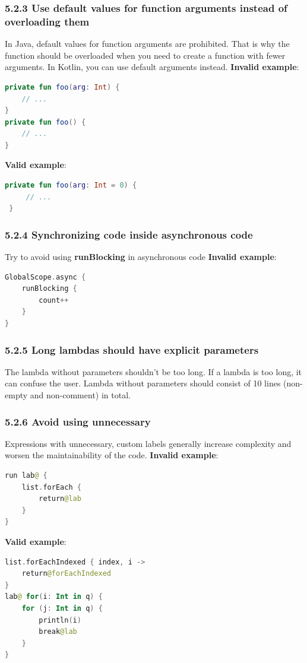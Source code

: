 \subsubsection*{\textbf{5.2.3 Use default values for function arguments instead of overloading them}}
\leavevmode\newline
\label{sec:5.2.3}
In Java, default values for function arguments are prohibited. That is why the function should be overloaded when you need to create a function with fewer arguments.
In Kotlin, you can use default arguments instead.
\textbf{Invalid example}:
\begin{lstlisting}[language=Kotlin]
private fun foo(arg: Int) {
    // ...
}
private fun foo() {
    // ...
}
\end{lstlisting}
\textbf{Valid example}:
\begin{lstlisting}[language=Kotlin]
 private fun foo(arg: Int = 0) {
     // ...
 }
\end{lstlisting}
\subsubsection*{\textbf{5.2.4 Synchronizing code inside asynchronous code}}
\leavevmode\newline
\label{sec:5.2.4}
Try to avoid using \textbf{runBlocking} in asynchronous code
\textbf{Invalid example}:
\begin{lstlisting}[language=Kotlin]
GlobalScope.async {
    runBlocking {
        count++
    }
}
\end{lstlisting}
\subsubsection*{\textbf{5.2.5 Long lambdas should have explicit parameters}}
\leavevmode\newline
\label{sec:5.2.5}
The lambda without parameters shouldn't be too long.
If a lambda is too long, it can confuse the user. Lambda without parameters should consist of 10 lines (non-empty and non-comment) in total.
\subsubsection*{\textbf{5.2.6 Avoid using unnecessary}}
\leavevmode\newline
\label{sec:5.2.6}
Expressions with unnecessary, custom labels generally increase complexity and worsen the maintainability of the code.
\textbf{Invalid example}:
\begin{lstlisting}[language=Kotlin]
run lab@ {
    list.forEach {
        return@lab
    }
}
\end{lstlisting}
\textbf{Valid example}:
\begin{lstlisting}[language=Kotlin]
list.forEachIndexed { index, i ->
    return@forEachIndexed
}
lab@ for(i: Int in q) {
    for (j: Int in q) {
        println(i)
        break@lab
    }
}
\end{lstlisting}
